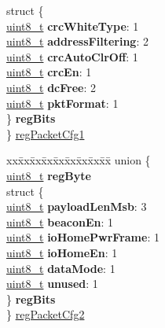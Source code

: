 \begin{DoxyCompactItemize}
\begin{tabbing}
\>struct \{\\
\>\>\hyperlink{vl53l0x__types_8h_aba7bc1797add20fe3efdf37ced1182c5}{uint8\_t} {\bfseries crcWhiteType}: 1\\
\>\>\hyperlink{vl53l0x__types_8h_aba7bc1797add20fe3efdf37ced1182c5}{uint8\_t} {\bfseries addressFiltering}: 2\\
\>\>\hyperlink{vl53l0x__types_8h_aba7bc1797add20fe3efdf37ced1182c5}{uint8\_t} {\bfseries crcAutoClrOff}: 1\\
\>\>\hyperlink{vl53l0x__types_8h_aba7bc1797add20fe3efdf37ced1182c5}{uint8\_t} {\bfseries crcEn}: 1\\
\>\>\hyperlink{vl53l0x__types_8h_aba7bc1797add20fe3efdf37ced1182c5}{uint8\_t} {\bfseries dcFree}: 2\\
\>\>\hyperlink{vl53l0x__types_8h_aba7bc1797add20fe3efdf37ced1182c5}{uint8\_t} {\bfseries pktFormat}: 1\\
\>\} {\bfseries regBits}\\
\} \hyperlink{structFSK__Register__Map_a375ba9eac7b1a4f0e8dd6d7090f273d7}{regPacketCfg1}\\

\end{tabbing}\item 
\begin{tabbing}
xx\=xx\=xx\=xx\=xx\=xx\=xx\=xx\=xx\=\kill
union \{\\
\>\hyperlink{vl53l0x__types_8h_aba7bc1797add20fe3efdf37ced1182c5}{uint8\_t} {\bfseries regByte}\\
\>struct \{\\
\>\>\hyperlink{vl53l0x__types_8h_aba7bc1797add20fe3efdf37ced1182c5}{uint8\_t} {\bfseries payloadLenMsb}: 3\\
\>\>\hyperlink{vl53l0x__types_8h_aba7bc1797add20fe3efdf37ced1182c5}{uint8\_t} {\bfseries beaconEn}: 1\\
\>\>\hyperlink{vl53l0x__types_8h_aba7bc1797add20fe3efdf37ced1182c5}{uint8\_t} {\bfseries ioHomePwrFrame}: 1\\
\>\>\hyperlink{vl53l0x__types_8h_aba7bc1797add20fe3efdf37ced1182c5}{uint8\_t} {\bfseries ioHomeEn}: 1\\
\>\>\hyperlink{vl53l0x__types_8h_aba7bc1797add20fe3efdf37ced1182c5}{uint8\_t} {\bfseries dataMode}: 1\\
\>\>\hyperlink{vl53l0x__types_8h_aba7bc1797add20fe3efdf37ced1182c5}{uint8\_t} {\bfseries unused}: 1\\
\>\} {\bfseries regBits}\\
\} \hyperlink{structFSK__Register__Map_afd5db4f6d0024aaad38619378200742f}{regPacketCfg2}\\


\end{tabbing}
\end{DoxyCompactItemize}

